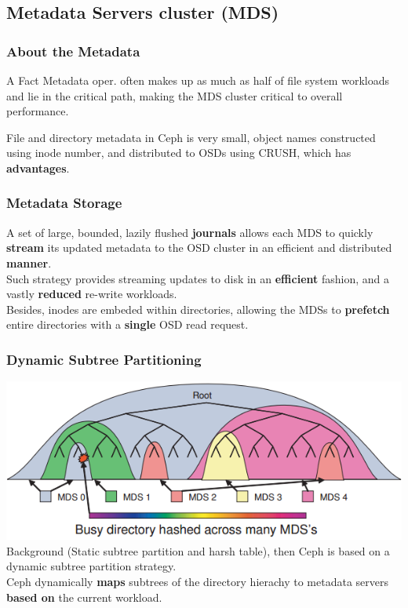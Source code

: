 \documentclass[cjk,slidestop,mathserif]{beamer}
\begin{document}
\begin{CJK}{UTF8}{gkai}
\subsection{Metadata Servers cluster (MDS)}
\begin{frame}
 \frametitle{About the Metadata}
 \vspace{8pt}
 \begin{exampleblock}{A Fact}
  Metadata oper. often makes up as much as half of file system workloads and lie in the critical path, 
  making the MDS cluster critical to overall performance.
 \end{exampleblock}
  \vspace{4pt}
  File and directory metadata in Ceph is very small, object names constructed using inode number, and distributed 
  to OSDs using CRUSH, which has \textbf{advantages}.
\end{frame}

\begin{frame}
 \frametitle{Metadata Storage}
 \vspace{8pt}
 A set of large, bounded, lazily flushed \textbf{journals} allows each MDS to quickly \textbf{stream} its updated metadata 
 to the OSD cluster in an efficient and distributed \textbf{manner}.\\
 \vspace{4pt}
 Such strategy provides streaming updates to disk in an \textbf{efficient} fashion, and a vastly \textbf{reduced} re-write workloads.\\
 \vspace{4pt}
 Besides, inodes are embeded within directories, allowing the MDSs to \textbf{prefetch} entire directories with a \textbf{single} 
 OSD read request.
\end{frame}

\begin{frame}
 \frametitle{Dynamic Subtree Partitioning}
 \includegraphics[width=\textwidth]{p2.png} \\
 Background (Static subtree partition and harsh table), then Ceph is based on a dynamic subtree partition 
 strategy.\\
 \vspace{2pt}
 Ceph dynamically \textbf{maps} subtrees of the directory hierachy to metadata servers \textbf{based on} the current workload. 
 

\end{frame}
\end{CJK}
\end{document}

